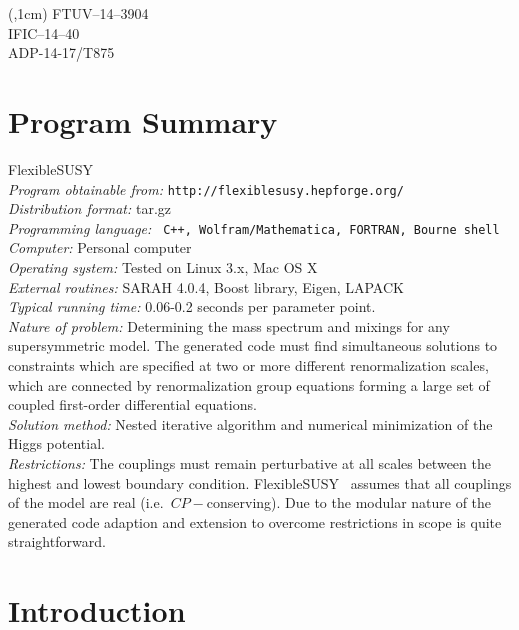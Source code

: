 \documentclass[final,3p,11pt,pdflatex]{elsarticle}
\makeatletter
\newcommand{\fs}{FlexibleSUSY\@\xspace}
\newcommand{\mathematica}{Mathematica\xspace}
\makeatother
\begin{document}
\begin{textblock*}{7em}(\textwidth,1cm)
\noindent\footnotesize
FTUV--14--3904 \\
IFIC--14--40 \\
ADP-14-17/T875
\end{textblock*}

\section{Program Summary}
 \fs\\ {\em Program obtainable from:}
         {\tt http://flexiblesusy.hepforge.org/}\\ {\em Distribution
           format:}\/ tar.gz\\ {\em Programming language:} {\tt
           C++, Wolfram/\mathematica, FORTRAN, Bourne shell}\\ {\em Computer:}\/ Personal computer\\ {\em Operating
           system:}\/ Tested on Linux 3.x, Mac OS X\\
         {\em External routines:}\/ SARAH 4.0.4, Boost library,
         Eigen, LAPACK\\ {\em
           Typical running time:}\/ 0.06-0.2 seconds per parameter
         point.\\ {\em Nature of problem:}\/ Determining the mass
         spectrum and mixings for any supersymmetric model. The
         generated code must find simultaneous solutions to
         constraints which are specified at two or more different
         renormalization scales, which are connected by
         renormalization group equations forming a large set of
         coupled first-order differential equations. \\ {\em Solution method:}\/
         Nested iterative algorithm and numerical minimization of the
         Higgs potential.  \\ {\em Restrictions:} The couplings must
         remain perturbative at all scales between the highest and
         lowest boundary condition.  \fs~ assumes that all couplings
         of the model are real (i.e.\ $CP-$conserving). Due to the
         modular nature of the generated code adaption and extension
         to overcome restrictions in scope is quite straightforward.





\newpage
\section{Introduction}
\end{document}
